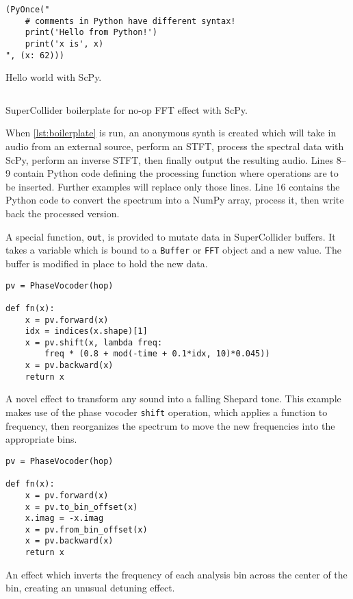 \documentclass{article}
\begin{document}
\begin{listing}[ht]
    \begin{verbatim}
(PyOnce("
    # comments in Python have different syntax!
    print('Hello from Python!')
    print('x is', x)
", (x: 62)))
    \end{verbatim}
    \caption{Hello world with ScPy.}
    \label{lst:helloworld}
\end{listing}

\begin{listing}[ht]
    \inputminted[linenos=true]{SuperCollider}{../examples/template.sc}
    \caption{SuperCollider boilerplate for no-op FFT effect with ScPy.}
    \label{lst:boilerplate}
\end{listing}

When \autoref{lst:boilerplate} is run, an anonymous synth is created which will take in audio
from an external source, perform an STFT, process the spectral data with ScPy, perform an inverse
STFT, then finally output the resulting audio. Lines 8--9 contain Python code defining the
processing function where operations are to be inserted. Further examples will replace only those
lines. Line 16 contains the Python code to convert the spectrum into a NumPy array, process it,
then write back the processed version.

A special function, \texttt{out}, is provided to mutate data in SuperCollider buffers. It takes a
variable which is bound to a \texttt{Buffer} or \texttt{FFT} object and a new value. The buffer is
modified in place to hold the new data.

\begin{listing}[ht]
    \begin{verbatim}
pv = PhaseVocoder(hop)

def fn(x):
    x = pv.forward(x)
    idx = indices(x.shape)[1]
    x = pv.shift(x, lambda freq:
        freq * (0.8 + mod(-time + 0.1*idx, 10)*0.045))
    x = pv.backward(x)
    return x
    \end{verbatim}
    \caption{A novel effect to transform any sound into a falling Shepard tone. This example makes
    use of the phase vocoder \texttt{shift} operation, which applies a function to frequency, then
    reorganizes the spectrum to move the new frequencies into the appropriate bins.}
    \label{lst:shepard}
\end{listing}

\begin{listing}[ht]
    \begin{verbatim}
pv = PhaseVocoder(hop)

def fn(x):
    x = pv.forward(x)
    x = pv.to_bin_offset(x)
    x.imag = -x.imag
    x = pv.from_bin_offset(x)
    x = pv.backward(x)
    return x
    \end{verbatim}
    \caption{An effect which inverts the frequency of each analysis bin across the center of
    the bin, creating an unusual detuning effect.}
    \label{lst:binflipper}
\end{listing}
\end{document}

